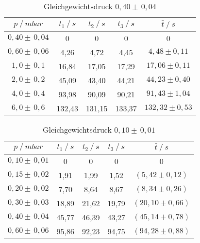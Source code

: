\begin{table}[H]
\centering
\label{tab:leck_Dreh3}
\begin{tabular}{c|c|c|c|c}
	{$p \:/\: \si{mbar}$} & {$t_1 \:/\: \si{s} $} & {$t_2 \:/\: \si{s} $} & {$t_3 \:/\: \si{s} $} & {$\bar{t} \:/\: \si{s}$}\\
\midrule
$0,40 \pm \, 0,04$ &0 &0 &0 &0\\
$0,60 \pm \, 0,06$ &   4,26 &  4,72 &  4,45 & $4,48 \pm 0,11$\\
$1,0 \pm \, 0,1$ &   16,84  &  17,05 &  17,29 & $17,06 \pm 0,11 $\\
$2,0 \pm \, 0,2$ &   45,09 &  43,40 &  44,21 & $44,23 \pm 0,40 $\\
$4,0 \pm \, 0,4$  &   93,98 &  90,09 & 90,21 & $91,43 \pm 1,04 $\\
$6,0 \pm \, 0,6$ &   132,43 &  131,15 &  133,37 & $132,32 \pm 0,53 $\\
\end{tabular}
\caption{Gleichgewichtsdruck $0,40 \pm \, 0,04$}
\end{table}

\begin{table}[H]
\centering
\label{tab:leck_Dreh4}
\begin{tabular}{c|c|c|c|c}
	{$p \:/\: \si{mbar}$} & {$t_1 \:/\: \si{s} $} & {$t_2 \:/\: \si{s} $} & {$t_3 \:/\: \si{s} $} & {$\bar{t} \:/\: \si{s}$}\\
\midrule
$0,10 \pm \, 0,01$ &0 &0 &0 &0\\
$0,15 \pm \, 0,02$ &   1,91 &  1,99 &  1,52 & $(5,42 \pm 0,12)$\\
$0,20 \pm \, 0,02$ &   7,70  &  8,64 &  8,67 & $(8,34 \pm 0,26) $\\
$0,30 \pm \, 0,03$ &   18,89 &  21,62 &  19,79 & $(20,10 \pm 0,66) $\\
$0,40 \pm \, 0,04$ &   45,77 &  46,39 & 43,27 & $(45,14 \pm 0,78) $\\
$0,60 \pm \, 0,06$ &   95,86 &  92,23 &  94,75 & $(94,28 \pm 0,88) $\\
\end{tabular}
\caption{Gleichgewichtsdruck $0,10 \pm \, 0,01$}
\end{table}
